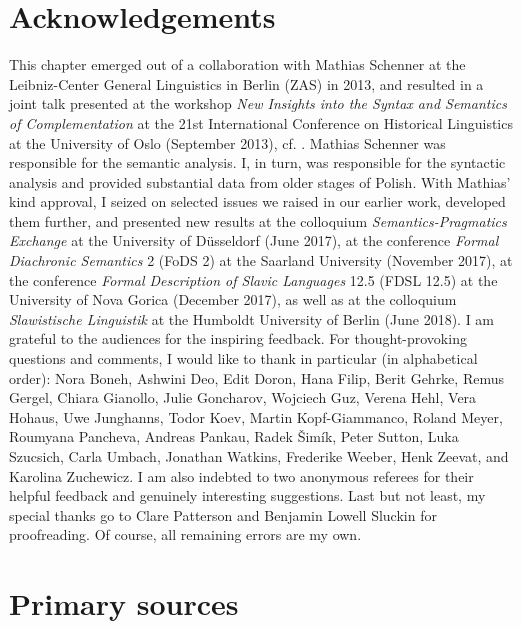 \documentclass[output=paper
,modfonts
,nonflat]{langsci/langscibook}
\begin{document}
\section*{Acknowledgements} This chapter emerged out of a collaboration with Mathias Schenner at the Leibniz-Center General Linguistics in Berlin (ZAS) in 2013, and resulted in a joint talk presented at the workshop \emph{New Insights into the Syntax and Semantics of Complementation} at the 21st International Conference on Historical Linguistics at the University of Oslo (September 2013), cf. \textcite{JedrzejowskiSchenner-2013}. Mathias Schenner was responsible for the semantic analysis. I, in turn, was responsible for the syntactic analysis and provided substantial data from older stages of Polish. With Mathias'  kind approval, I seized on selected issues we raised in our earlier work, developed them further, and presented new results at the colloquium \emph{Semantics-Pragmatics Exchange} at the University of Düsseldorf (June 2017), at the conference \emph{Formal Diachronic Semantics} 2 (FoDS 2) at the Saarland University (November 2017), at the conference \emph{Formal Description of Slavic Languages} 12.5 (FDSL 12.5) at the University of Nova Gorica (December 2017), as well as at the colloquium \emph{Slawistische Linguistik} at the Humboldt University of Berlin (June 2018). I am grateful to the audiences for the inspiring feedback. For thought-provoking questions and comments, I would like to thank in particular (in alphabetical order): Nora Boneh, Ashwini Deo, Edit Doron, Hana Filip, Berit Gehrke, Remus Gergel, Chiara Gianollo, Julie Goncharov, Wojciech Guz, Verena Hehl, Vera Hohaus, Uwe Junghanns, Todor Koev, Martin Kopf-Giammanco, Roland Meyer, Roumyana Pancheva, Andreas Pankau, Radek Šimík, Peter Sutton, Luka Szucsich, Carla Umbach, Jonathan Watkins, Frederike Weeber, Henk Zeevat, and Karolina Zuchewicz. I am also indebted to two anonymous referees for their helpful feedback and genuinely interesting suggestions. Last but not least, my special thanks go to Clare Patterson and Benjamin Lowell Sluckin for proofreading. Of course, all remaining errors are my own.

\section*{Primary sources}
\end{document}
